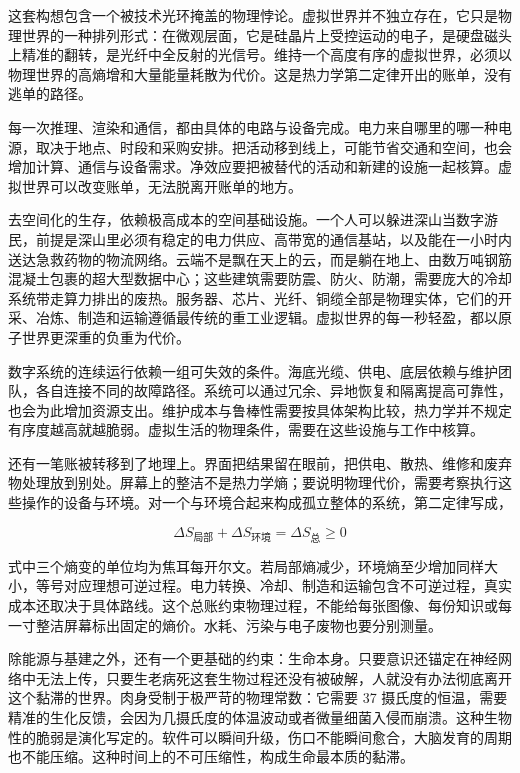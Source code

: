 这套构想包含一个被技术光环掩盖的物理悖论。虚拟世界并不独立存在，它只是物理世界的一种排列形式：在微观层面，它是硅晶片上受控运动的电子，是硬盘磁头上精准的翻转，是光纤中全反射的光信号。维持一个高度有序的虚拟世界，必须以物理世界的高熵增和大量能量耗散为代价。这是热力学第二定律开出的账单，没有逃单的路径。

每一次推理、渲染和通信，都由具体的电路与设备完成。电力来自哪里的哪一种电源，取决于地点、时段和采购安排。把活动移到线上，可能节省交通和空间，也会增加计算、通信与设备需求。净效应要把被替代的活动和新建的设施一起核算。虚拟世界可以改变账单，无法脱离开账单的地方。

去空间化的生存，依赖极高成本的空间基础设施。一个人可以躲进深山当数字游民，前提是深山里必须有稳定的电力供应、高带宽的通信基站，以及能在一小时内送达急救药物的物流网络。云端不是飘在天上的云，而是躺在地上、由数万吨钢筋混凝土包裹的超大型数据中心；这些建筑需要防震、防火、防潮，需要庞大的冷却系统带走算力排出的废热。服务器、芯片、光纤、铜缆全部是物理实体，它们的开采、冶炼、制造和运输遵循最传统的重工业逻辑。虚拟世界的每一秒轻盈，都以原子世界更深重的负重为代价。

数字系统的连续运行依赖一组可失效的条件。海底光缆、供电、底层依赖与维护团队，各自连接不同的故障路径。系统可以通过冗余、异地恢复和隔离提高可靠性，也会为此增加资源支出。维护成本与鲁棒性需要按具体架构比较，热力学并不规定有序度越高就越脆弱。虚拟生活的物理条件，需要在这些设施与工作中核算。

还有一笔账被转移到了地理上。界面把结果留在眼前，把供电、散热、维修和废弃物处理放到别处。屏幕上的整洁不是热力学熵；要说明物理代价，需要考察执行这些操作的设备与环境。对一个与环境合起来构成孤立整体的系统，第二定律写成，

\begin{equation}
\Delta S_{\text{局部}}+\Delta S_{\text{环境}}=\Delta S_{\text{总}}\ge 0
\end{equation}

式中三个熵变的单位均为焦耳每开尔文。若局部熵减少，环境熵至少增加同样大小，等号对应理想可逆过程。电力转换、冷却、制造和运输包含不可逆过程，真实成本还取决于具体路线。这个总账约束物理过程，不能给每张图像、每份知识或每一寸整洁屏幕标出固定的熵价。水耗、污染与电子废物也要分别测量。


除能源与基建之外，还有一个更基础的约束：生命本身。只要意识还锚定在神经网络中无法上传，只要生老病死这套生物过程还没有被破解，人就没有办法彻底离开这个黏滞的世界。肉身受制于极严苛的物理常数：它需要 37 摄氏度的恒温，需要精准的生化反馈，会因为几摄氏度的体温波动或者微量细菌入侵而崩溃。这种生物性的脆弱是演化写定的。软件可以瞬间升级，伤口不能瞬间愈合，大脑发育的周期也不能压缩。这种时间上的不可压缩性，构成生命最本质的黏滞。

